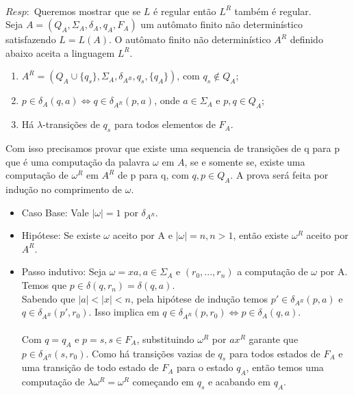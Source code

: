 \documentclass{homework}
\begin{document}
\pagestyle{fancy}

\\

	$Resp:$ Queremos mostrar que se $L$ é regular então $L^R$ também é regular.\\
	Seja $A = (Q_A,\Sigma_A,\delta_A,q_A,F_A)$ um autômato finito não determinístico satisfazendo $L = L(A)$. O autômato finito não determinístico $A^R$ definido abaixo aceita a linguagem $L^R$.
	\begin{enumerate}
		\item $A^R = (Q_A \cup \{q_s\},\Sigma_A,\delta_{A^R},q_s,\{q_A\})$, com $q_s \notin Q_A$;
		\item $p \in \delta_A(q,a) \iff q \in \delta_{A^R}(p,a)$, onde $a \in \Sigma_A$ e $p,q \in Q_A$;
		\item Há $\lambda$-transições de $q_s$ para todos elementos de $F_A$.
	\end{enumerate}
	Com isso precisamos provar que existe uma sequencia de transições de q para p que é uma computação da palavra $\omega$ em $A$, se e somente se, existe uma computação de $\omega^R$ em $A^R$ de p para q, com $q,p \in Q_A$. A prova será feita por indução no comprimento de $\omega$.
	\begin{itemize}
		\item Caso Base: Vale $|\omega|=1$ por $\delta_{A^R}$.
		\item Hipótese: Se existe $\omega$ aceito por A e $|\omega|=n,n > 1$, então existe $\omega^R$ aceito por $A^R$.
		\item Passo indutivo: Seja $\omega = xa, a \in \Sigma_A$ e $(r_0,...,r_n)$ a computação de $\omega$ por A. Temos que $p \in \delta(q, r_{n}) = \delta(q, a)$.\\
		Sabendo que $|a| < |x| < n$, pela hipótese de indução temos $p' \in \delta_{A^R}(p,a)$ e $q \in \delta_{A^R}(p', r_0)$. Isso implica em $q \in \delta_{A^R}(p,r_0) \iff p \in \delta_A(q,a)$.\\\\
		Com $q = q_A$ e $p = s, s \in F_A$, substituindo $\omega^R$ por $ax^R$ garante que $p \in \delta_{A^R}(s, r_0)$. Como há transições vazias de $q_s$ para todos estados de $F_A$ e uma transição de todo estado de $F_A$ para o estado $q_A$, então temos uma computação de $\lambda \omega^R = \omega^R$ começando em $q_s$ e acabando em $q_A$.				
	\end{itemize}
\end{document}
